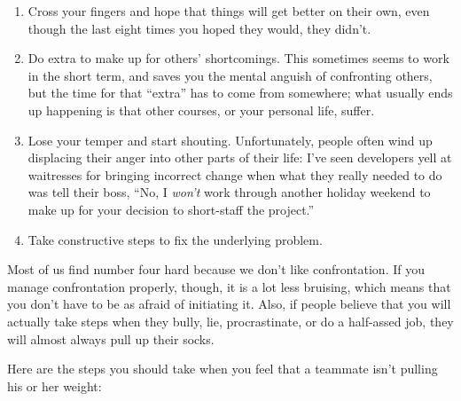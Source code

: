 \documentclass{report}
\begin{document}
\begin{enumerate}

  \item Cross your fingers and hope that things will get better on
  their own, even though the last eight times you hoped they would,
  they didn't.

  \item Do extra to make up for others' shortcomings.  This sometimes
  seems to work in the short term, and saves you the mental anguish of
  confronting others, but the time for that ``extra'' has to come from
  somewhere; what usually ends up happening is that other courses, or
  your personal life, suffer.

  \item Lose your temper and start shouting.  Unfortunately, people
  often wind up displacing their anger into other parts of their life:
  I've seen developers yell at waitresses for bringing incorrect
  change when what they really needed to do was tell their boss, ``No,
  I \emph{won't} work through another holiday weekend to make up for
  your decision to short-staff the project.''

  \item Take constructive steps to fix the underlying problem.
 
\end{enumerate}

Most of us find number four hard because we don't like confrontation.
If you manage confrontation properly, though, it is a lot less
bruising, which means that you don't have to be as afraid of
initiating it.  Also, if people believe that you will actually take
steps when they bully, lie, procrastinate, or do a half-assed job,
they will almost always pull up their socks.

Here are the steps you should take when you feel that a teammate isn't
pulling his or her weight:
\end{document}
